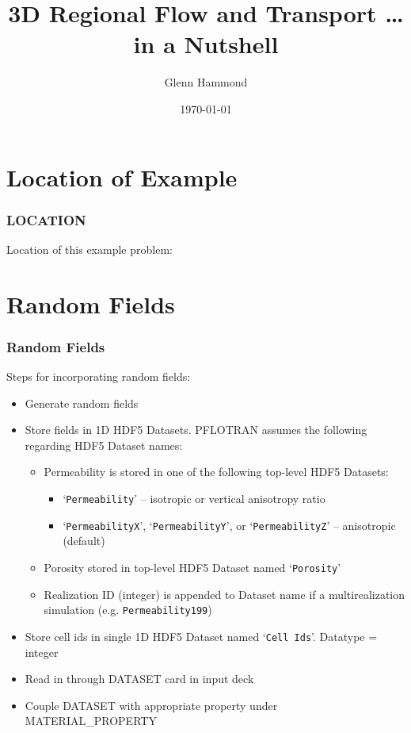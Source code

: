 \documentclass{beamer}
\begin{document}
\title{3D Regional Flow and Transport \ldots in a Nutshell}
\author{Glenn Hammond}
\date{\today}


\section{Location of Example}

\begin{frame}\frametitle{LOCATION}

Location of this example problem:


\end{frame}

\section{Random Fields}

\begin{frame}\frametitle{Random Fields}

Steps for incorporating random fields:
  \begin{itemize}
    \item Generate random fields
    \item Store fields in 1D HDF5 Datasets. PFLOTRAN assumes the following regarding HDF5 Dataset names:
      \begin{itemize}
        \item Permeability is stored in one of the following top-level HDF5 Datasets:
        \begin{itemize}
          \item `\verb=Permeability=' -- isotropic or vertical anisotropy ratio
          \item `\verb=PermeabilityX=', `\verb=PermeabilityY=', or `\verb=PermeabilityZ=' -- anisotropic (default)
        \end{itemize}
        \item Porosity stored in top-level HDF5 Dataset named `\verb=Porosity='
        \item Realization ID (integer) is appended to Dataset name if a multirealization simulation (e.g. \verb=Permeability199=)
      \end{itemize}
    \item Store cell ids in single 1D HDF5 Dataset named `\verb=Cell Ids='. Datatype = integer
    \item Read in through DATASET card in input deck
    \item Couple DATASET with appropriate property under MATERIAL\_PROPERTY
  \end{itemize}

\end{frame}
\end{document}
